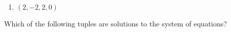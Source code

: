 \documentclass{ximera}
\begin{document}
\begin{exercise}
\begin{enumerate}
        \item $(2,-2,2,0)$
        \begin{selectAll}
        \end{selectAll}
      \end{enumerate}    
      
      Which of the following tuples are solutions to the system of equations?

        \begin{selectAll}
        \end{selectAll}

\end{exercise}
\end{document}
